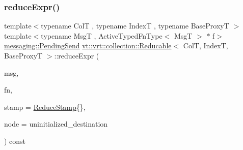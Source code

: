 \mbox{\label{structvt_1_1vrt_1_1collection_1_1_reducable_ac126400bba751792a930f4982df137c9}} 
\subsubsection{\texorpdfstring{reduce\+Expr()}{reduceExpr()}\hspace{0.1cm}{\footnotesize\ttfamily [1/2]}}
{\footnotesize\ttfamily template$<$typename ColT , typename IndexT , typename Base\+ProxyT $>$ \\
template$<$typename MsgT , Active\+Typed\+Fn\+Type$<$ Msg\+T $>$ $\ast$ f$>$ \\
\hyperlink{structvt_1_1messaging_1_1_pending_send}{messaging\+::\+Pending\+Send} \hyperlink{structvt_1_1vrt_1_1collection_1_1_reducable}{vt\+::vrt\+::collection\+::\+Reducable}$<$ ColT, IndexT, Base\+ProxyT $>$\+::reduce\+Expr (\begin{DoxyParamCaption}\item[{MsgT $\ast$const}]{msg,  }\item[{\hyperlink{structvt_1_1vrt_1_1collection_1_1_reducable_a9f5a6c385efafe1fa52937f4809a9486}{Reduce\+Idx\+Func\+Type}}]{fn,  }\item[{\hyperlink{structvt_1_1vrt_1_1collection_1_1_reducable_a19f80baf23f36dad4948ef07322fd0cb}{Reduce\+Stamp}}]{stamp = {\ttfamily \hyperlink{structvt_1_1vrt_1_1collection_1_1_reducable_a19f80baf23f36dad4948ef07322fd0cb}{Reduce\+Stamp}\{\}},  }\item[{\hyperlink{namespacevt_a866da9d0efc19c0a1ce79e9e492f47e2}{Node\+Type} const \&}]{node = {\ttfamily uninitialized\+\_\+destination} }\end{DoxyParamCaption}) const}

\mbox{\label{structvt_1_1vrt_1_1collection_1_1_reducable_a8614291c2fa37b9c714581b2b4bb231f}} 
